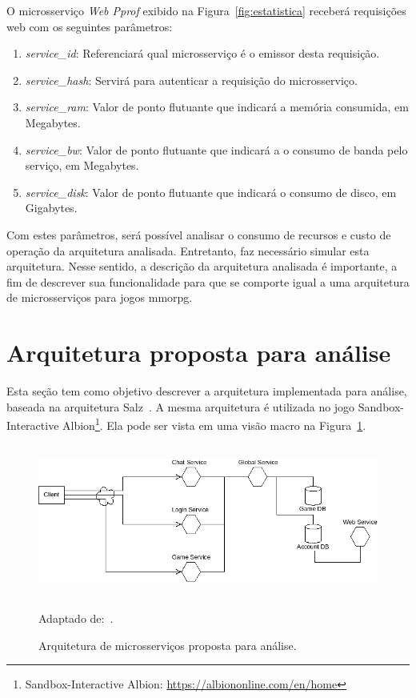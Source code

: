O microsserviço \textit{Web Pprof} exibido na Figura~\ref{fig:estatistica} receberá requisições web com os seguintes parâmetros:


\begin{enumerate}
  \item \textit{service\_id}: Referenciará qual microsserviço é o emissor desta requisição.
  \item \textit{service\_hash}: Servirá para autenticar a requisição do microsserviço.
  \item \textit{service\_ram}: Valor de ponto flutuante que indicará a memória consumida, em Megabytes.
  \item \textit{service\_bw}: Valor de ponto flutuante que indicará a o consumo de banda pelo serviço, em Megabytes.
  \item \textit{service\_disk}: Valor de ponto flutuante que indicará o consumo de disco, em Gigabytes.
\end{enumerate}

Com estes parâmetros, será possível analisar o consumo de recursos e custo de operação da arquitetura analisada.
%
Entretanto, faz necessário simular esta arquitetura.
%
Nesse sentido, a descrição da arquitetura analisada é importante, a fim de descrever sua funcionalidade para que se comporte igual a uma arquitetura de microsserviços para jogos \ac{mmorpg}.



\section{Arquitetura proposta para análise}
\label{sec:arquitetura_proposta}



Esta seção tem como objetivo descrever a arquitetura implementada para análise, baseada na arquitetura Salz~\cite{albion_online_unite}.
%
A mesma arquitetura é utilizada no jogo Sandbox-Interactive Albion\footnote{Sandbox-Interactive Albion: \url{https://albiononline.com/en/home}}.
%
Ela pode ser vista em uma visão macro na Figura~\ref{fig:salz}.



\begin{figure}[htb!]
\caption{Arquitetura de microsserviços proposta para análise.}
\label{fig:salz}
\includegraphics[height=5cm]{img/cap3/salz.png}
\centering

Adaptado de:~\cite{albion_online_unite}.
\end{figure}


